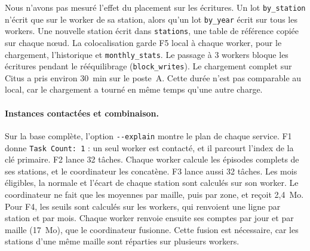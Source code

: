 \documentclass{rapportClass}
\newcommand{\cmd}[1]{\texttt{#1}}
\begin{document}
Nous n'avons pas mesuré l'effet du placement sur les écritures. Un lot \cmd{by\_station} n'écrit que sur le
worker de sa station, alors qu'un lot \cmd{by\_year} écrit sur tous les workers. Une nouvelle station écrit dans
\cmd{stations}, une table de référence copiée sur chaque nœud. La colocalisation garde F5 local à chaque worker,
pour le chargement, l'historique et \cmd{monthly\_stats}. Le passage à 3 workers bloque les écritures pendant le
rééquilibrage (\cmd{block\_writes}). Le chargement complet sur Citus a pris environ 30~min sur le poste~A. Cette
durée n'est pas comparable au local, car le chargement a tourné en même temps qu'une autre charge.

\paragraph{Instances contactées et combinaison.} Sur la base complète, l'option \cmd{-{}-explain} montre le
plan de chaque service. F1 donne \cmd{Task Count: 1} : un seul worker est contacté, et il parcourt l'index de la
clé primaire. F2 lance 32 tâches. Chaque worker calcule les épisodes complets de ses stations, et le
coordinateur les concatène. F3 lance aussi 32 tâches. Les mois éligibles, la normale et l'écart de chaque station
sont calculés sur son worker. Le coordinateur ne fait que les moyennes par maille, puis par zone, et reçoit
2,4~Mo. Pour F4, les seuils sont calculés sur les workers, qui renvoient une ligne par station et par mois.
Chaque worker renvoie ensuite ses comptes par jour et par maille (17~Mo), que le coordinateur fusionne. Cette
fusion est nécessaire, car les stations d'une même maille sont réparties sur plusieurs workers.

\end{document}
